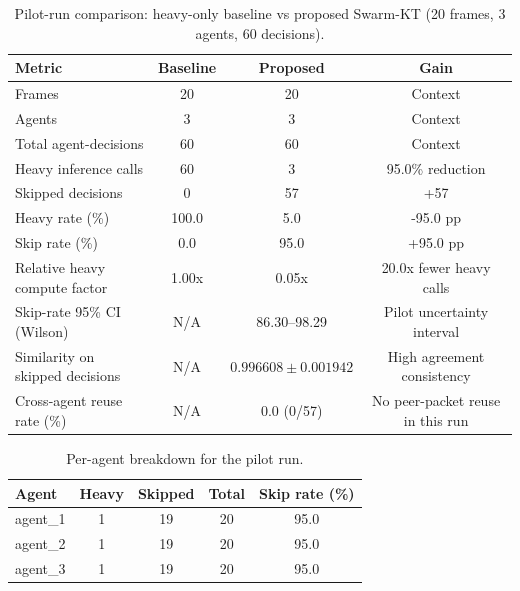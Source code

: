 
\begin{table}[t]
\centering
\caption{Pilot-run comparison: heavy-only baseline vs proposed Swarm-KT (20 frames, 3 agents, 60 decisions).}
\label{tab:pilot_main_results}
\begin{tabular}{lccc}
\toprule
Metric & Baseline & Proposed & Gain \\
\midrule
Frames & 20 & 20 & Context \\
Agents & 3 & 3 & Context \\
Total agent-decisions & 60 & 60 & Context \\
Heavy inference calls & 60 & 3 & 95.0\% reduction \\
Skipped decisions & 0 & 57 & +57 \\
Heavy rate (\%) & 100.0 & 5.0 & -95.0 pp \\
Skip rate (\%) & 0.0 & 95.0 & +95.0 pp \\
Relative heavy compute factor & 1.00x & 0.05x & 20.0x fewer heavy calls \\
Skip-rate 95\% CI (Wilson) & N/A & 86.30--98.29 & Pilot uncertainty interval \\
Similarity on skipped decisions & N/A & $0.996608 \pm 0.001942$ & High agreement consistency \\
Cross-agent reuse rate (\%) & N/A & 0.0 (0/57) & No peer-packet reuse in this run \\
\bottomrule
\end{tabular}
\end{table}

\begin{table}[t]
\centering
\caption{Per-agent breakdown for the pilot run.}
\label{tab:pilot_per_agent}
\begin{tabular}{lcccc}
\toprule
Agent & Heavy & Skipped & Total & Skip rate (\%) \\
\midrule
agent\_1 & 1 & 19 & 20 & 95.0 \\
agent\_2 & 1 & 19 & 20 & 95.0 \\
agent\_3 & 1 & 19 & 20 & 95.0 \\
\bottomrule
\end{tabular}
\end{table}

